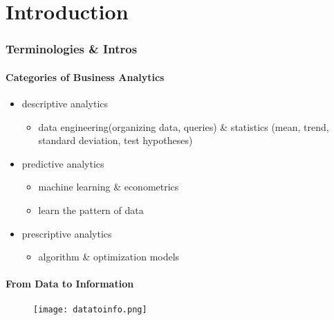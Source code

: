 \newpage
\part{Introduction}

\section{Terminologies \& Intros }

\subsection{Categories of Business Analytics}
\begin{itemize}
	\item descriptive analytics
		\begin{itemize}
			\item data engineering(organizing data, queries) \& statistics (mean, trend, standard deviation, test hypotheses)
		\end{itemize}
	
	 \item predictive analytics
	 	\begin{itemize}
	 		\item machine learning \& econometrics
	 		\item learn the pattern of data
	 	\end{itemize}
 	
 	\item prescriptive analytics
 	\begin{itemize}
 		\item algorithm \& optimization models
 	\end{itemize}
	
\end{itemize}

\subsection{From Data to Information}
\begin{figure}[H]
	\centering
	\texttt{[image: datatoinfo.png]}
\end{figure}

